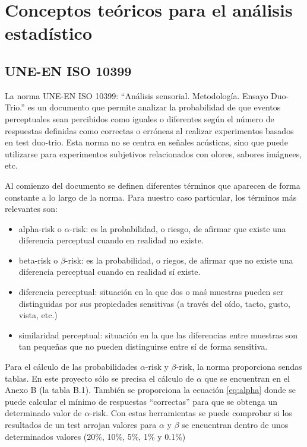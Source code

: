 \documentclass[11pt,a4paper]{book}
\begin{document}
    \section{Conceptos teóricos para el análisis estadístico}    
        \subsection{UNE-EN ISO 10399}
            La norma UNE-EN ISO 10399: ``Análisis sensorial. Metodología. Ensayo Duo-Trio.''\cite{ISO10399} es un documento que permite analizar la probabilidad de que eventos perceptuales sean percibidos como iguales o diferentes según el número de respuestas definidas como correctas o erróneas al realizar experimentos basados en test duo-trio. Esta norma no se centra en señales acústicas, sino que puede utilizarse para experimentos subjetivos relacionados con olores, sabores imágnees, etc.
            
        
            Al comienzo del documento se definen diferentes términos que aparecen de forma constante a lo largo de la norma. Para nuestro caso particular, los términos más relevantes son:
        
            \begin{itemize}
                \item alpha-risk o $\alpha$-risk: es la probabilidad, o riesgo, de afirmar que existe una diferencia perceptual cuando en realidad no existe.
                \item beta-risk o $\beta$-risk: es la probabilidad, o riegos, de afirmar que no existe una diferencia perceptual cuando en realidad sí existe.
                \item diferencia perceptual: situación en la que dos o maś muestras pueden ser distinguidas por sus propiedades sensitivas (a través del oído, tacto, gusto, vista, etc.)
                \item similaridad perceptual: situación en la que las diferencias entre muestras son tan pequeñas que no pueden distinguirse entre sí de forma sensitiva.
            \end{itemize}
            Para el cálculo de las probabilidades $\alpha$-risk y $\beta$-risk, la norma proporciona sendas tablas. En este proyecto sólo se precisa el cálculo de $\alpha$ que se encuentran en el Anexo B  (la tabla B.1). También se proporciona la ecuación \ref{eq:alpha} donde se puede calcular el mínimo de respuestas ``correctas'' para que se obtenga un determinado valor de $\alpha$-risk. Con estas herramientas se puede comprobar si los resultados de un test arrojan valores para $\alpha$ y $\beta$ se encuentran dentro de unos determinados valores (20\%, 10\%, 5\%, 1\% y 0.1\%)
            
\end{document}
